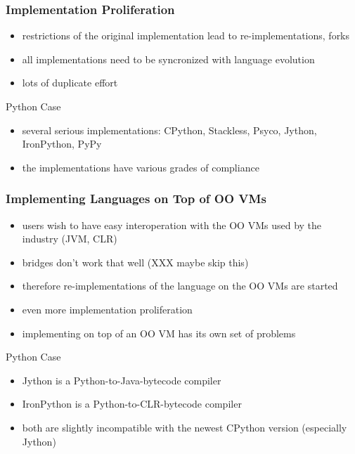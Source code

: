 \documentclass[utf8x]{beamer}
\begin{document}
\begin{frame}
  \frametitle{Implementation Proliferation}
  \begin{itemize}
  \item
    restrictions of the original implementation lead to re-implementations,
    forks
  \item
    all implementations need to be syncronized with language evolution
  \item
    lots of duplicate effort
  \end{itemize}
  \pause
  \begin{block}{
    Python Case}
    \begin{itemize}
    \item
      several serious implementations: CPython, Stackless, Psyco, Jython,
      IronPython, PyPy
    \item
      the implementations have various grades of compliance
    \end{itemize}
  \end{block}
\end{frame}

\begin{frame}
  \frametitle{Implementing Languages on Top of OO VMs}
  \begin{itemize}
  \item
    users wish to have easy interoperation with the OO VMs used by the industry
    (JVM, CLR)
  \item
    bridges don't work that well (XXX maybe skip this)
  \item
    therefore re-implementations of the language on the OO VMs are started
  \item
    even more implementation proliferation
  \item
    implementing on top of an OO VM has its own set of problems
  \end{itemize}
  \pause
  \begin{block}{
    Python Case}
    \begin{itemize}
    \item
      \alert{Jython} is a Python-to-Java-bytecode compiler
    \item
      \alert{IronPython} is a Python-to-CLR-bytecode compiler
    \item
      both are slightly incompatible with the newest CPython version (especially
      Jython)
    \end{itemize}
  \end{block}
\end{frame}
\end{document}
